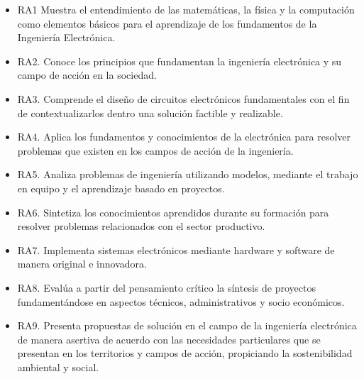 \documentclass{article}
\begin{document}
\begin{itemize}
  \item RA1   Muestra el entendimiento de las matemáticas, la física y la computación como elementos   básicos para el aprendizaje de los fundamentos de la Ingeniería Electrónica.                                                                                   
  \item RA2.   Conoce los principios que fundamentan la ingeniería electrónica y su campo de   acción en la sociedad.                                                                                                                                                 
  \item RA3.   Comprende el diseño de circuitos electrónicos fundamentales con el fin de   contextualizarlos dentro una solución factible y realizable.                                                                                                               
  \item RA4.   Aplica los fundamentos y conocimientos de la electrónica para resolver   problemas que existen en los campos de acción de la ingeniería.                                                                                                               
  \item RA5.   Analiza problemas de ingeniería utilizando modelos, mediante el trabajo en   equipo y el aprendizaje basado en proyectos.                                                                                                                              
  \item RA6.   Sintetiza los conocimientos aprendidos durante su formación para resolver   problemas relacionados con el sector productivo.                                                                                                                           
 \item  RA7.   Implementa sistemas electrónicos mediante hardware y software de manera   original e innovadora.                                                                                                                                                       
 \item  RA8.   Evalúa a partir del pensamiento crítico la síntesis de proyectos   fundamentándose en aspectos técnicos, administrativos y socio económicos.                                                                                                           
  \item RA9.   Presenta propuestas de solución en el campo de la ingeniería electrónica de   manera asertiva de acuerdo con las necesidades particulares que se presentan   en los territorios y campos de acción, propiciando la sostenibilidad   ambiental y social.

\end{itemize}
\end{document}
